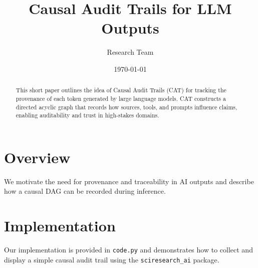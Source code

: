 \documentclass{article}
\title{Causal Audit Trails for LLM Outputs}
\author{Research Team}
\date{\today}
\begin{document}
\maketitle

\begin{abstract}
This short paper outlines the idea of Causal Audit Trails (CAT) for tracking the provenance of each token generated by large language models. CAT constructs a directed acyclic graph that records how sources, tools, and prompts influence claims, enabling auditability and trust in high-stakes domains.
\end{abstract}

\section{Overview}
We motivate the need for provenance and traceability in AI outputs and describe how a causal DAG can be recorded during inference.

\section{Implementation}
Our implementation is provided in \texttt{code.py} and demonstrates how to collect and display a simple causal audit trail using the \texttt{sciresearch\_ai} package.
\end{document}
